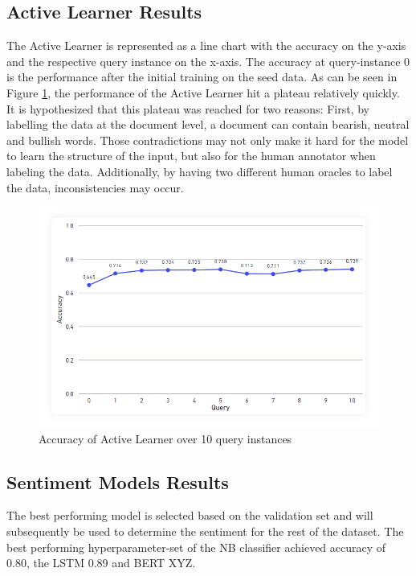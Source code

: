 \documentclass[11pt, a4paper]{article}
\begin{document}
\subsection{Active Learner Results}
The Active Learner is represented as  a line chart with the accuracy on the y-axis and the respective query instance on the x-axis.
The accuracy at query-instance 0 is the performance after the initial training on the seed data.
As can be seen in Figure \ref{fig:ActiveLearner}, the performance of the Active Learner hit a plateau relatively quickly. It is hypothesized that
this plateau was reached for two reasons: First, by labelling the data at the document level, a document can contain bearish, neutral
and bullish words. Those contradictions may not only make it hard for the model to learn the structure of the input, but also for 
the human annotator when labeling the data. Additionally, by having two different human oracles to label the data, inconsistencies
may occur.

\begin{figure}
    \centering
    \includegraphics[width=\textwidth]{ActiveLearner.png}
    \caption{Accuracy of Active Learner over 10 query instances}
    \label{fig:ActiveLearner}
\end{figure}

\subsection{Sentiment Models Results}
The best performing model is selected based on the validation set and will subsequently be used to determine the sentiment for the
rest of the dataset. The best performing hyperparameter-set of the NB classifier achieved accuracy of 0.80, the LSTM 0.89 and BERT XYZ. \\
\end{document}
